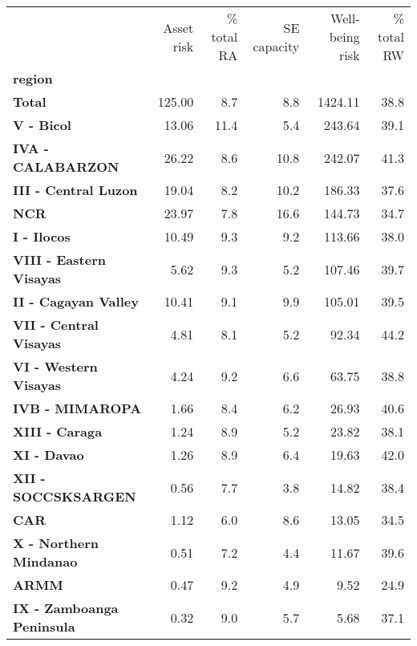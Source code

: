 \begin{tabular}{lrrrrr}
\toprule
{} &  Asset risk &  \% total RA &  SE capacity &  Well-being risk &  \% total RW \\
\textbf{region                  } &             &             &              &                  &             \\
\midrule
\textbf{Total                   } &      125.00 &         8.7 &          8.8 &          1424.11 &        38.8 \\
\textbf{V - Bicol               } &       13.06 &        11.4 &          5.4 &           243.64 &        39.1 \\
\textbf{IVA - CALABARZON        } &       26.22 &         8.6 &         10.8 &           242.07 &        41.3 \\
\textbf{III - Central Luzon     } &       19.04 &         8.2 &         10.2 &           186.33 &        37.6 \\
\textbf{NCR                     } &       23.97 &         7.8 &         16.6 &           144.73 &        34.7 \\
\textbf{I - Ilocos              } &       10.49 &         9.3 &          9.2 &           113.66 &        38.0 \\
\textbf{VIII - Eastern Visayas  } &        5.62 &         9.3 &          5.2 &           107.46 &        39.7 \\
\textbf{II - Cagayan Valley     } &       10.41 &         9.1 &          9.9 &           105.01 &        39.5 \\
\textbf{VII - Central Visayas   } &        4.81 &         8.1 &          5.2 &            92.34 &        44.2 \\
\textbf{VI - Western Visayas    } &        4.24 &         9.2 &          6.6 &            63.75 &        38.8 \\
\textbf{IVB - MIMAROPA          } &        1.66 &         8.4 &          6.2 &            26.93 &        40.6 \\
\textbf{XIII - Caraga           } &        1.24 &         8.9 &          5.2 &            23.82 &        38.1 \\
\textbf{XI - Davao              } &        1.26 &         8.9 &          6.4 &            19.63 &        42.0 \\
\textbf{XII - SOCCSKSARGEN      } &        0.56 &         7.7 &          3.8 &            14.82 &        38.4 \\
\textbf{CAR                     } &        1.12 &         6.0 &          8.6 &            13.05 &        34.5 \\
\textbf{X - Northern Mindanao   } &        0.51 &         7.2 &          4.4 &            11.67 &        39.6 \\
\textbf{ARMM                    } &        0.47 &         9.2 &          4.9 &             9.52 &        24.9 \\
\textbf{IX - Zamboanga Peninsula} &        0.32 &         9.0 &          5.7 &             5.68 &        37.1 \\
\bottomrule
\end{tabular}
